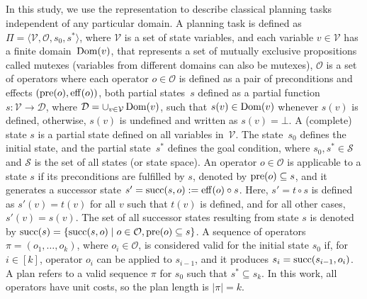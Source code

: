 \documentclass[ppgc,diss,english]{iiufrgs}
\begin{document}
\subsection{\sas}
In this study, we use the \sas representation to describe classical planning tasks independent of any particular domain. A \sas planning task is defined as $\Pi=\langle\mathcal{V},\mathcal{O},s_0,s^*\rangle$, where $\mathcal{V}$ is a set of state variables, and each variable $v\in \mathcal{V}$ has a finite domain~$\operatorname{Dom}(v)$, that represents a set of mutually exclusive propositions called mutexes (variables from different domains can also be mutexes), $\mathcal{O}$ is a set of operators where each operator $o \in \mathcal{O}$ is defined as a pair of preconditions and effects $(\operatorname{pre}(o),\operatorname{eff}(o))$, both partial states~$s$ defined as a partial function $s:\mathcal{V}\rightarrow \mathcal{D}$, where $\mathcal{D}=\cup_{v\in \mathcal{V}}\operatorname{Dom}(v)$, such that $s(v)\in \operatorname{Dom}(v)$ whenever $s(v)$ is defined, otherwise, $s(v)$ is undefined and written as $s(v)=\bot$.  A (complete) state $s$ is a partial state defined on all variables in~$\mathcal{V}$. The state~$s_0$ defines the initial state, and the partial state~$s^*$ defines the goal condition, where $s_0, s^* \in \mathcal{S}$ and $\mathcal{S}$ is the set of all states (or state space).
An operator $o \in \mathcal{O}$ is applicable to a state $s$ if its preconditions are fulfilled by $s$, denoted by $\operatorname{pre}(o) \subseteq s$, and it generates a successor state $s'=\operatorname{succ}(s,o):=\operatorname{eff}(o)\circ s$. Here, $s'=t\circ s$ is defined as $s'(v)=t(v)$ for all $v$ such that $t(v)$ is defined, and for all other cases, $s'(v)=s(v)$. The set of all successor states resulting from state $s$ is denoted by $\operatorname{succ}(s)=\{{\operatorname{succ}(s,o)\mid o\in \mathcal{O}, \operatorname{pre}(o) \subseteq s}\}$. A sequence of operators $\pi=(o_1,\ldots,o_k)$, where $o_i\in \mathcal{O}$, is considered valid for the initial state $s_0$ if, for $i\in[k]$, operator $o_i$ can be applied to $s_{i-1}$, and it produces $s_i=\operatorname{succ}(s_{i-1},o_i)$. A plan refers to a valid sequence $\pi$ for $s_0$ such that $s^* \subseteq s_k$. In this work, all operators have unit costs, so the plan length is $|\pi| = k$.
\end{document}
